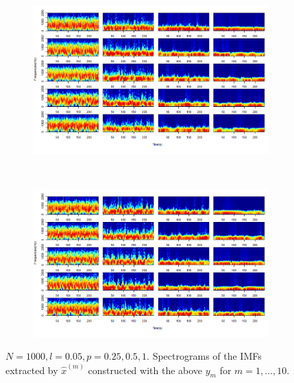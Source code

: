 \documentclass[11pt, a4paper]{article} %
\begin{document}
\begin{figure}[H]
\begin{subfigure}{1.1\textwidth}
  \centering
  \includegraphics[width=\linewidth]{spectro_N1000_l005_IMF_1_5.png}
  \label{fig:sfig1}
\end{subfigure}\\
\begin{subfigure}{1.1\textwidth}
  \centering
  \includegraphics[width=\linewidth]{spectro_N1000_l005_IMF_6_10.png}
  \label{fig:sfig2}
\end{subfigure}
\caption{$N = 1000, l = 0.05, p = 0.25, 0.5, 1$. Spectrograms of the IMFs extracted by $\hat{x}^{(m)}$ constructed with the above $y_m$ for $m = 1, \dots, 10$.}
\label{fig:fig}
\end{figure}
\restoregeometry



\end{document}
